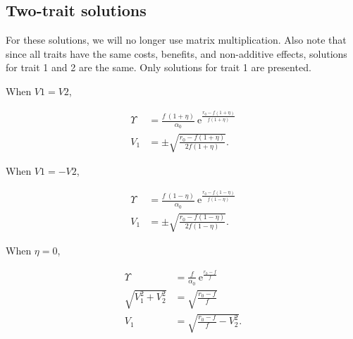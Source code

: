 \subsection*{Two-trait solutions}

For these solutions, we will no longer use matrix multiplication.
Also note that since all traits have the same costs, benefits, and
non-additive effects, solutions for trait 1 and 2 are the same.
Only solutions for trait 1 are presented.

When $V1 = V2$,

\begin{equation}  \label{eq:two-traits-finals1}
\begin{align}
    \Upsilon &= \frac{ f ~ ( 1 + \eta ) }{ \alpha_0 } ~
        \text{e}^{\frac{  r_0 - f ( 1 + \eta ) }{ f ( 1 + \eta ) } }
        \\
    V_1 &= \pm \sqrt{
        \frac{ r_0 - f (1 + \eta) }{ 2 f (1 + \eta) }
    }
    \text{.}
\end{align}
\end{equation}


When $V1 = - V2$,

\begin{equation}  \label{eq:two-traits-finals2}
\begin{align}
    \Upsilon &= \frac{ f ~ ( 1 - \eta ) }{ \alpha_0 } ~
        \text{e}^{\frac{  r_0 - f ( 1 - \eta ) }{ f ( 1 - \eta ) } }
        \\
    V_1 &= \pm \sqrt{
        \frac{ r_0 - f (1 - \eta) }{ 2 f (1 - \eta) }
    }
    \text{.}
\end{align}
\end{equation}

When $\eta = 0$,

\begin{equation}  \label{eq:two-traits-finals2}
\begin{align}
    \Upsilon &= \frac{ f }{ \alpha_0 } ~ \text{e}^{\frac{  r_0 - f }{ f } } \\
    \sqrt{V_1^2 + V_2^2} &= \sqrt{ \frac{ r_0 - f }{ f } } \\
    V_1 &= \sqrt{ \frac{ r_0 - f }{ f } - V_2^2 }
    \text{.}
\end{align}
\end{equation}





